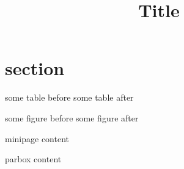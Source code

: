 \documentclass{article}
\title{Title}
\begin{document}
\section{section}
\begin{minipage}{4cm}%
some table before
\label{tab:test}%
some table after
\tagstructend
\end{minipage}

\parbox{4cm}{%
some figure before
\label{fig:test}
some figure after\tagstructend}

\begin{minipage}{4cm}
minipage content
\end{minipage}

\parbox{4cm}{parbox content}
\end{document}
